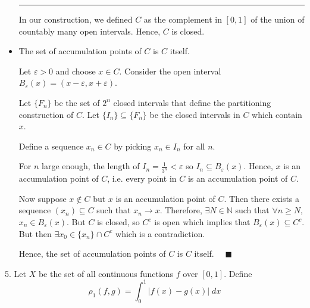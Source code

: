 \documentclass[12pt]{article}
\newcommand{\N}{\mathbb{N}}
\newcommand{\qed}{\quad \blacksquare}
\newcommand{\abs}[1]{\left\vert #1 \right\vert}
\newcommand{\ep}{\varepsilon}
\newcommand{\sub}{\subseteq}
\renewcommand{\div}{\vspace*{10pt}\hrule \vspace*{10pt}}
\begin{document}
\begin{itemize}
            \div  

            In our construction, we defined $C$ as the complement in $[0, 1]$ of the union of countably many open intervals. Hence, $C$ is closed. 

        \color{black}

    \item The set of accumulation points of $C$ is $C$ itself.
    
        \color{blue}
            Let $\ep > 0$ and choose $x \in C$. Consider the open interval $B_{\ep}(x) = (x - \ep, x + \ep)$.

            Let $\{F_n\}$ be the set of $2^n$ closed intervals that define the partitioning construction of $C$. Let $\{I_n\} \sub \{F_n\}$ be the closed intervals in $C$ which contain $x$. 

            Define a sequence $x_n \in C$ by picking $x_n \in I_n$ for all $n$. 
                        
            For $n$ large enough, the length of $I_n = \frac{1}{3^n} < \ep$ so $I_n \sub B_{\ep}(x)$. Hence, $x$ is an accumulation point of $C$, i.e. every point in $C$ is an accumulation point of $C$. 

            Now suppose $x \notin C$ but $x$ is an accumulation point of $C$. Then there exists a sequence $(x_n) \sub C$ such that $x_n \to x$. Therefore, $\exists N \in \N$ such that $\forall n \geq N$, $x_n \in B_{\ep}(x)$. But $C$ is closed, so $C^c$ is open which implies that $B_{\ep}(x) \sub C^c$. But then $\exists x_0 \in \{x_n\} \cap C^c$ which is a contradiction. 
            
            Hence, the set of accumulation points of $C$ is $C$ itself. $\qed$
            
        \color{black}


\end{itemize}

\pagebreak

5. Let $X$ be the set of all continuous functions $f$ over $[0, 1]$. Define 
\[\rho_1(f, g) = \int_0^1 \abs{f(x) - g(x)} \; dx\]
\end{document}
